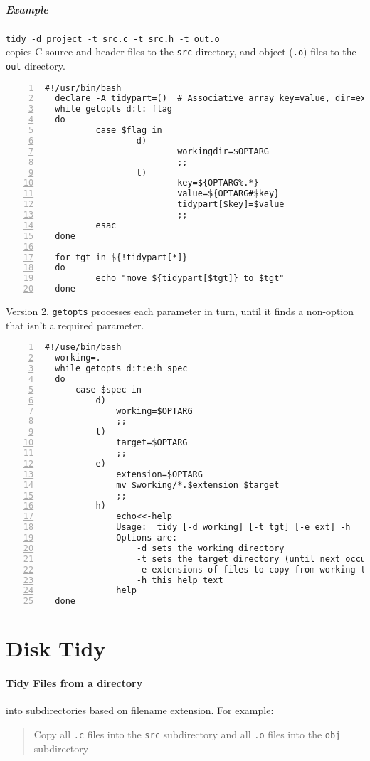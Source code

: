 \documentclass[12pt,a4paper]{article}
\begin{document}
\subparagraph{Example} \texttt{tidy -d project -t src.c -t src.h -t out.o}\\
copies C source and header files to the \texttt{src} directory, and object (\texttt{.o}) files to the \texttt{out} directory.
\begin{Verbatim}[numbers=left,gobble=2]
  #!/usr/bin/bash
  declare -A tidypart=()  # Associative array key=value, dir=ext
  while getopts d:t: flag
  do
          case $flag in
                  d)
                          workingdir=$OPTARG
                          ;;
                  t)
                          key=${OPTARG%.*}
                          value=${OPTARG#$key}
                          tidypart[$key]=$value
                          ;;
          esac
  done

  for tgt in ${!tidypart[*]}
  do
          echo "move ${tidypart[$tgt]} to $tgt"
  done
\end{Verbatim}
Version 2.  \texttt{getopts} processes each parameter in turn, until it finds a non-option that isn't a required parameter.
\begin{Verbatim}[numbers=left,gobble=2]
  #!/use/bin/bash
  working=.
  while getopts d:t:e:h spec
  do
      case $spec in
          d)
              working=$OPTARG
              ;;
          t)
              target=$OPTARG
              ;;
          e)
              extension=$OPTARG
              mv $working/*.$extension $target
              ;;
          h)
              echo<<-help
              Usage:  tidy [-d working] [-t tgt] [-e ext] -h
              Options are:
                  -d sets the working directory
                  -t sets the target directory (until next occurrence of -t)
                  -e extensions of files to copy from working to target (no dot needed)
                  -h this help text
              help
  done
\end{Verbatim}

\section{Disk Tidy}
\paragraph{Tidy Files from a directory} into subdirectories based on filename extension.  For example:
\begin{quote}
  Copy all \texttt{.c} files into the \texttt{src} subdirectory and all \texttt{.o} files into the \texttt{obj} subdirectory
\end{quote}
\newcommand{\command}[1]{\texttt{#1}}
\newcommand{\optionarg}[2]{$[$\texttt{#1} \texttt{\emph{#2}}$]$}
\newcommand{\argument}[1]{$\langle$\texttt{\emph{#1}}$\rangle$}
\newcommand{\arguments}[1]{\argument{#1}\ldots}
\end{document}
